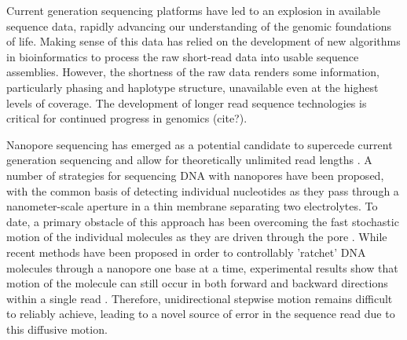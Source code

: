 \documentclass{biophys_letter}
\begin{document}
\begin{multicols}{2}


Current generation sequencing platforms have led to an explosion in available sequence data, rapidly advancing our understanding of the genomic foundations of life.
Making sense of this data has relied on the development of new algorithms in bioinformatics to process the raw short-read data into usable sequence assemblies.
However, the shortness of the raw data renders some information, particularly phasing and haplotype structure, unavailable even at the highest levels of coverage.
The development of longer read sequence technologies is critical for continued progress in genomics (cite?). 

Nanopore sequencing has emerged as a potential candidate to supercede current generation sequencing and allow for theoretically unlimited read lengths \cite{Branton:2008}.
A number of strategies for sequencing DNA with nanopores have been proposed, with the common basis of detecting individual nucleotides as they pass through a nanometer-scale aperture in a thin membrane separating two electrolytes.
To date, a primary obstacle of this approach has been overcoming the fast stochastic motion of the individual molecules as they are driven through the pore \cite{Venkatesan:2011, Lu:2011}.
While recent methods have been proposed in order to controllably 'ratchet' DNA molecules through a nanopore one base at a time, experimental results show that motion of the molecule can still occur in both forward and backward directions within a single read \cite{Luan:2011, Olasagasti:2010, Cherf:2012}.
Therefore, unidirectional stepwise motion remains difficult to reliably achieve, leading to a novel source of error in the sequence read due to this diffusive motion.


\end{multicols}
\end{document}
